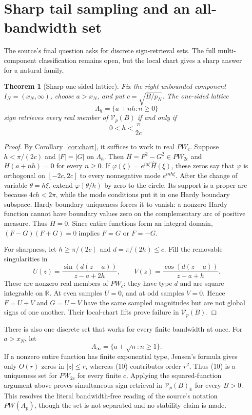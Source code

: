 \documentclass[11pt]{article}
\newtheorem{theorem}{Theorem}
\newcommand{\R}{\mathbb R}
\newcommand{\V}{\mathcal V}
\begin{document}
\section*{Sharp tail sampling and an all-bandwidth set}

The source's final question asks for discrete sign-retrieval sets.  The full
multi-component classification remains open, but the local chart gives a
sharp answer for a natural family.

\begin{theorem}[Sharp one-sided lattice]\label{thm:sampling}
Fix the right unbounded component $I_N=(x_N,\infty)$, choose $a>x_N$, and put
$c=\sqrt{B/p_N}$.  The one-sided lattice
\[
                         \Lambda_h=\{a+nh:n\ge0\}
\]
sign retrieves every real member of $\V_p(B)$ if and only if
\[
                              0<h<\frac{\pi}{2c}.       \tag{8}
\]
\end{theorem}

\begin{proof}
By Corollary~\ref{cor:chart}, it suffices to work in real $PW_c$.  Suppose
$h<\pi/(2c)$ and $|F|=|G|$ on $\Lambda_h$.  Then
$H=F^2-G^2\in PW_{2c}$ and $H(a+nh)=0$ for every $n\ge0$.  If
$\varphi(\xi)=e^{ia\xi}\widehat H(\xi)$, these zeros say that $\varphi$ is
orthogonal on $[-2c,2c]$ to every nonnegative mode $e^{inh\xi}$.
After the change of variable $\theta=h\xi$, extend $\varphi(\theta/h)$ by
zero to the circle.  Its support is a proper arc because $4ch<2\pi$, while
the mode conditions put it in one Hardy boundary subspace.  Hardy boundary
uniqueness forces it to vanish: a nonzero Hardy function cannot have boundary
values zero on the complementary arc of positive measure.  Thus $H=0$.
Since entire functions form an integral domain,
$(F-G)(F+G)=0$ implies $F=G$ or $F=-G$.

For sharpness, let $h\ge\pi/(2c)$ and $d=\pi/(2h)\le c$.  Fill the removable
singularities in
\[
 U(z)=\frac{\sin(d(z-a))}{z-a+2h},\qquad
 V(z)=\frac{\cos(d(z-a))}{z-a+h}.                      \tag{9}
\]
These are nonzero real members of $PW_c$: they have type $d$ and are square
integrable on $\R$.  At even samples $U=0$, and at odd samples $V=0$.
Hence $F=U+V$ and $G=U-V$ have the same sampled magnitudes but are not global
signs of one another.  Their local-chart lifts prove failure in $\V_p(B)$.
\end{proof}

There is also one discrete set that works for every finite bandwidth at once.
For $a>x_N$, let
\[
                         \Lambda_\infty=\{a+\sqrt n:n\ge1\}.          \tag{10}
\]
If a nonzero entire function has finite exponential type, Jensen's formula
gives only $O(r)$ zeros in $|z|\le r$, whereas (10) contributes order $r^2$.
Thus (10) is a uniqueness set for $PW_{2c}$ for every finite $c$.  Applying
the squared-function argument above proves simultaneous sign retrieval in
$\V_p(B)_\R$ for every $B>0$.  This resolves the literal bandwidth-free
reading of the source's notation $PW(A_p)$, though the set is not separated
and no stability claim is made.
\end{document}
